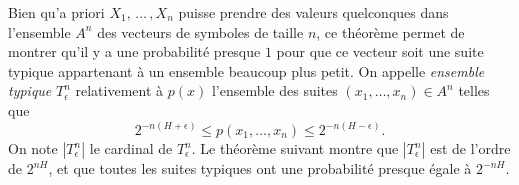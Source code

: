 Bien qu'a priori $X_1,\,\dots\,,X_n$ puisse prendre des
valeurs quelconques dans l'ensemble $A^n$ des vecteurs de
symboles de taille $n$, ce th\'eor\`eme permet de montrer
qu'il y a une probabilit\'e presque $1$ pour que ce vecteur soit
une suite typique appartenant \`a un ensemble beaucoup plus
petit. On appelle {\it ensemble typique} $T^n_\epsilon$
relativement \`a $p(x)$ l'ensemble des suites
$(x_1,\dots,x_n) \in A^n$ telles que
\begin{equation}
\label{Typique-def}
2^{-n (H+\epsilon)} \leq p(x_1,\dots,x_n) \leq
2^{-n (H-\epsilon)} .
\end{equation}
On note $|T^n_\epsilon|$ le cardinal de $T^n_\epsilon$.
Le th\'eor\`eme suivant montre que
$|T^n_\epsilon|$
est de l'ordre de $2^{nH}$, et que toutes les
suites typiques ont une probabilit\'e presque \'egale
\`a $2^{-nH}$.

